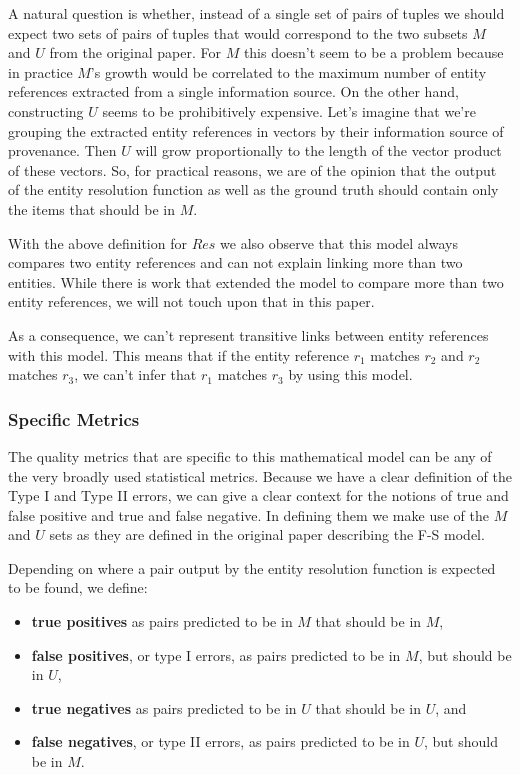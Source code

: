 \documentclass[lettersize,journal]{IEEEtran}
\begin{document}
    A natural question is whether, instead of a single set of pairs of tuples we
    should expect two sets of pairs of tuples that would correspond to the two
    subsets $M$ and $U$ from the original paper.
    For $M$ this doesn't seem to be a problem because in practice $M$'s growth
    would be correlated to the maximum number of entity references extracted
    from a single information source.
    On the other hand, constructing $U$ seems to be prohibitively expensive.
    Let's imagine that we're grouping the extracted entity references in vectors
    by their information source of provenance.
    Then $U$ will grow proportionally to the length of the vector product of
    these vectors.
    So, for practical reasons, we are of the opinion that the output of the
    entity resolution function as well as the ground truth should contain only
    the items that should be in $M$.

    With the above definition for $Res$ we also observe that this model always
    compares two entity references and can not explain linking more than two
    entities\cite{Tal11}.
    While there is work that extended the model to compare more than two 
    entity references\cite{Kon19}, we will not touch upon that in this paper.
    
    As a consequence, we can't represent transitive links between entity
    references with this model.
    This means that if the entity reference $r_1$ matches $r_2$ and
    $r_2$ matches $r_3$, we can't infer that $r_1$ matches $r_3$ by using this
    model\cite{Tal11}.

    \subsubsection[fms-measure]{Specific Metrics}\label{fsm-measure}

    The quality metrics that are specific to this mathematical model can be any
    of the very broadly used statistical metrics.
    Because we have a clear definition of the Type I and Type II errors, we can
    give a clear context for the notions of true and false positive and true and
    false negative.
    In defining them we make use of the $M$ and $U$ sets as they are defined in
    the original paper describing the F-S model.

    Depending on where a pair output by the entity resolution function is
    expected to be found, we define:

    \begin{itemize}
        \item \textbf{true positives} as pairs predicted to be in $M$ that
        should be in $M$,
        \item \textbf{false positives}, or type I errors, as pairs predicted to
        be in $M$, but should be in $U$,
        \item \textbf{true negatives} as pairs predicted to be in $U$ that
        should be in $U$, and
        \item \textbf{false negatives}, or type II errors, as pairs predicted to
        be in $U$, but should be in $M$.
    \end{itemize}
\end{document}
